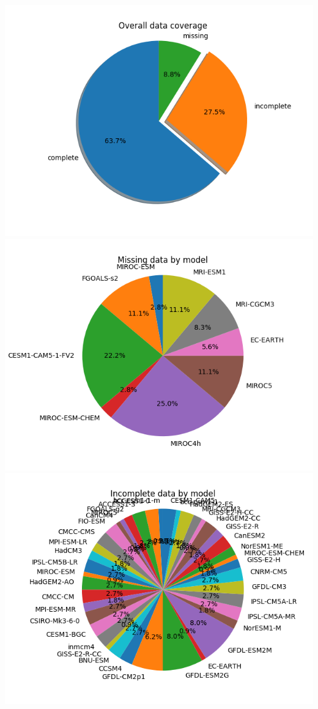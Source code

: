 \documentclass[letterpaper,10pt,english]{sphinxmanual}
\begin{document}
\includegraphics[scale=0.5]{overall}
\includegraphics[scale=0.5]{missing}
\includegraphics[scale=0.5]{incomplete}
\end{document}
